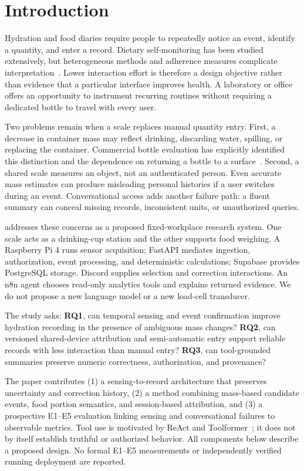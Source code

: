 \section{Introduction}\label{sec:intro}
Hydration and food diaries require people to repeatedly notice an event, identify a quantity, and enter a record. Dietary self-monitoring has been studied extensively, but heterogeneous methods and adherence measures complicate interpretation~\cite{burke2011}. Lower interaction effort is therefore a design objective rather than evidence that a particular interface improves health. A laboratory or office offers an opportunity to instrument recurring routines without requiring a dedicated bottle to travel with every user.

Two problems remain when a scale replaces manual quantity entry. First, a decrease in container mass may reflect drinking, discarding water, spilling, or replacing the container. Commercial bottle evaluation has explicitly identified this distinction and the dependence on returning a bottle to a surface~\cite{cohen2022}. Second, a shared scale measures an object, not an authenticated person. Even accurate mass estimates can produce misleading personal histories if a user switches during an event. Conversational access adds another failure path: a fluent summary can conceal missing records, inconsistent units, or unauthorized queries.

\sys{} addresses these concerns as a proposed fixed-workplace research system. One scale acts as a drinking-cup station and the other supports food weighing. A Raspberry Pi 4 runs sensor acquisition; FastAPI mediates ingestion, authorization, event processing, and deterministic calculations; Supabase provides PostgreSQL storage. Discord supplies selection and correction interactions. An n8n agent chooses read-only analytics tools and explains returned evidence. We do not propose a new language model or a new load-cell transducer.

The study asks: \textbf{RQ1}, can temporal sensing and event confirmation improve hydration recording in the presence of ambiguous mass changes? \textbf{RQ2}, can versioned shared-device attribution and semi-automatic entry support reliable records with less interaction than manual entry? \textbf{RQ3}, can tool-grounded summaries preserve numeric correctness, authorization, and provenance?

The paper contributes (1) a sensing-to-record architecture that preserves uncertainty and correction history, (2) a method combining mass-based candidate events, food portion semantics, and session-based attribution, and (3) a prospective E1--E5 evaluation linking sensing and conversational failures to observable metrics. Tool use is motivated by ReAct and Toolformer~\cite{yao2023react,schick2023}; it does not by itself establish truthful or authorized behavior. All components below describe a proposed design. No formal E1--E5 measurements or independently verified running deployment are reported.
